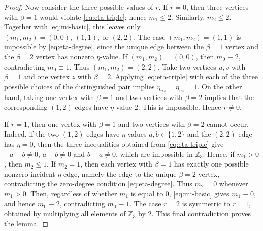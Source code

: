 \documentclass[10pt,a4paper]{amsart}
\newcommand{\Z}{\mathbb Z}
\begin{document}
\begin{proof}
    Now consider the three possible values of \(r\).
    If \(r=0\), then three vertices with \(\beta=1\) would violate \eqref{eq:eta-triple}; hence \(m_1\le 2\). Similarly, \(m_2\le 2\). Together with \eqref{eq:mi-basic}, this leaves only
    \((m_1,m_2)=(0,0),\ (1,1),\ \text{or }(2,2).\)
    The case \((m_1,m_2)=(1,1)\) is impossible by \eqref{eq:eta-degree}, since the unique edge between the \(\beta=1\) vertex and the \(\beta=2\) vertex has nonzero \(\eta\)-value. If \((m_1,m_2)=(0,0)\), then \(m_0\equiv 2\), contradicting $m_0\equiv 1$. Thus \((m_1,m_2)=(2,2)\).
    Take two vertices \(u,v\) with \(\beta=1\) and one vertex \(z\) with \(\beta=2\). Applying \eqref{eq:eta-triple} with each of the three possible choices of the distinguished pair implies
    \(\eta_{uz}=\eta_{vz}=1.\)
    On the other hand, taking one vertex with \(\beta=1\) and two vertices with \(\beta=2\) implies that the corresponding \((1,2)\)-edges have \(\eta\)-value \(2\). This is impossible. Hence \(r\ne 0\).

    If \(r=1\), then one vertex with \(\beta=1\) and two vertices with \(\beta=2\) cannot occur. Indeed, if the two \((1,2)\)-edges have \(\eta\)-values $a,b\in\{1,2\}$ and the \((2,2)\)-edge has \(\eta=0\), then the three inequalities obtained from \eqref{eq:eta-triple} give $-a-b\ne0$, $a-b\ne0$ and $b-a\ne0$, which are impossible in $\Z_3$. Hence, if \(m_1>0\), then \(m_2\le 1\). If \(m_2=1\), then each vertex with \(\beta=1\) has exactly one possible nonzero incident \(\eta\)-edge, namely the edge to the unique \(\beta=2\) vertex, contradicting the zero-degree condition \eqref{eq:eta-degree}. Thus \(m_2=0\) whenever \(m_1>0\). Then, regardless of whether $m_1$ is equal to 0, \eqref{eq:mi-basic} gives \(m_1\equiv 0\), and hence \(m_0\equiv 2\), contradicting \(m_0\equiv 1\).
    The case \(r=2\) is symmetric to \(r=1\), obtained by multiplying all elements of \(\Z_3\) by \(2\).
    This final contradiction proves the lemma.
\end{proof}
\end{document}
